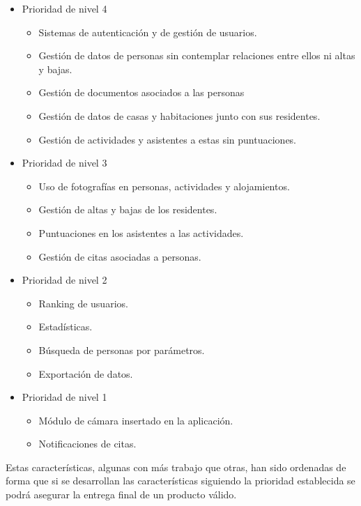 \begin{itemize}
    \item Prioridad de nivel 4
    \begin{itemize}
        \item Sistemas de autenticación y de gestión de usuarios.
        \item Gestión de datos de personas sin contemplar relaciones entre ellos ni altas y bajas.
        \item Gestión de documentos asociados a las personas
        \item Gestión de datos de casas y habitaciones junto con sus residentes.
        \item Gestión de actividades y asistentes a estas sin puntuaciones.
    \end{itemize}
    \item Prioridad de nivel 3
    \begin{itemize}
        \item Uso de fotografías en personas, actividades y alojamientos.
        \item Gestión de altas y bajas de los residentes.
        \item Puntuaciones en los asistentes a las actividades.
        \item Gestión de citas asociadas a personas.
    \end{itemize}
    \item Prioridad de nivel 2
    \begin{itemize}
        \item Ranking de usuarios.
        \item Estadísticas.
        \item Búsqueda de personas por parámetros.
        \item Exportación de datos.
    \end{itemize}
    \item Prioridad de nivel 1
    \begin{itemize}
        \item Módulo de cámara insertado en la aplicación.
        \item Notificaciones de citas. 
    \end{itemize}
\end{itemize}

Estas características, algunas con más trabajo que otras, han sido ordenadas de forma que si se desarrollan las características siguiendo la prioridad establecida se podrá asegurar la entrega final de un producto válido.

